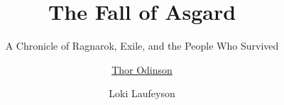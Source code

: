 \newcommand{\presentationdateyear}{2026}
\newcommand{\presentationdatemonth}{10}
\newcommand{\presentationdateday}{23}

\title{The Fall of Asgard}
\subtitle{A Chronicle of Ragnarok, Exile, and the People Who Survived}
\author[Thor and Loki]{\underline{Thor Odinson} \and Loki Laufeyson}
\date{\presentationdate}
